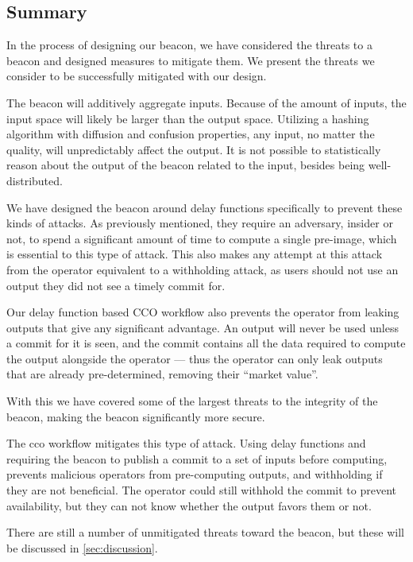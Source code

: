 \subsection{Summary}
In the process of designing our beacon, we have considered the threats to a beacon and designed measures to mitigate them.
We present the threats we consider to be successfully mitigated with our design.

The beacon will additively aggregate inputs.
Because of the amount of inputs, the input space will likely be larger than the output space.
Utilizing a hashing algorithm with diffusion and confusion properties, any input, no matter the quality, will unpredictably affect the output.
It is not possible to statistically reason about the output of the beacon related to the input, besides being well-distributed.

We have designed the beacon around delay functions specifically to prevent these kinds of attacks.
As previously mentioned, they require an adversary, insider or not, to spend a significant amount of time to compute a single pre-image, which is essential to this type of attack.
This also makes any attempt at this attack from the operator equivalent to a withholding attack, as users should not use an output they did not see a timely commit for.

Our delay function based CCO workflow also prevents the operator from leaking outputs that give any significant advantage.
An output will never be used unless a commit for it is seen, and the commit contains all the data required to compute the output alongside the operator --- thus the operator can only leak outputs that are already pre-determined, removing their \enquote{market value}.

With this we have covered some of the largest threats to the integrity of the beacon, making the beacon significantly more secure.

The \acrshort{cco} workflow mitigates this type of attack.
Using delay functions and requiring the beacon to publish a commit to a set of inputs before computing, prevents malicious operators from pre-computing outputs, and withholding if they are not beneficial.
The operator could still withhold the commit to prevent availability, but they can not know whether the output favors them or not.

There are still a number of unmitigated threats toward the beacon, but these will be discussed in \vref{sec:discussion}.

